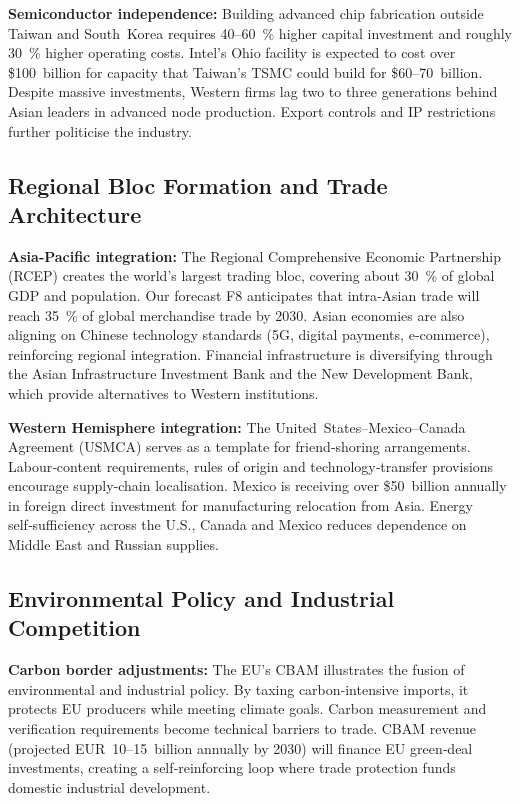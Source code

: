 \documentclass[12pt]{article}
\begin{document}
\textbf{Semiconductor independence:}  Building advanced chip fabrication outside Taiwan and South Korea requires 40–60 \% higher capital investment and roughly 30 \% higher operating costs.  Intel’s Ohio facility is expected to cost over \$100 billion for capacity that Taiwan’s TSMC could build for \$60–70 billion.  Despite massive investments, Western firms lag two to three generations behind Asian leaders in advanced node production.  Export controls and IP restrictions further politicise the industry.

\subsection{Regional Bloc Formation and Trade Architecture}

\textbf{Asia‑Pacific integration:}  The Regional Comprehensive Economic Partnership (RCEP) creates the world’s largest trading bloc, covering about 30 \% of global GDP and population.  Our forecast F8 anticipates that intra‑Asian trade will reach 35 \% of global merchandise trade by 2030.  Asian economies are also aligning on Chinese technology standards (5G, digital payments, e‑commerce), reinforcing regional integration.  Financial infrastructure is diversifying through the Asian Infrastructure Investment Bank and the New Development Bank, which provide alternatives to Western institutions.

\textbf{Western Hemisphere integration:}  The United States–Mexico–Canada Agreement (USMCA) serves as a template for friend‑shoring arrangements.  Labour‑content requirements, rules of origin and technology‑transfer provisions encourage supply‑chain localisation.  Mexico is receiving over \$50 billion annually in foreign direct investment for manufacturing relocation from Asia.  Energy self‑sufficiency across the U.S., Canada and Mexico reduces dependence on Middle East and Russian supplies.

\subsection{Environmental Policy and Industrial Competition}

\textbf{Carbon border adjustments:}  The EU’s CBAM illustrates the fusion of environmental and industrial policy.  By taxing carbon‑intensive imports, it protects EU producers while meeting climate goals.  Carbon measurement and verification requirements become technical barriers to trade.  CBAM revenue (projected EUR 10–15 billion annually by 2030) will finance EU green‑deal investments, creating a self‑reinforcing loop where trade protection funds domestic industrial development.
\end{document}
